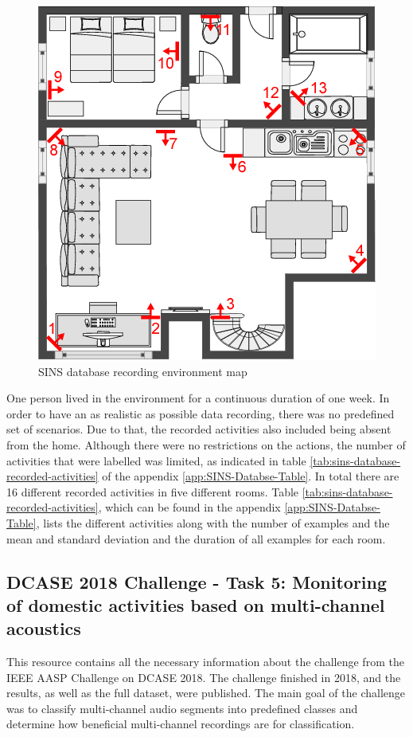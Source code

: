 \begin{figure}[htbp]
	\centering
	\includegraphics[scale=0.5]{baa-documentation/img/SINS_database_floor_map.png}
	\caption[SINS database recording environment map]{SINS database recording environment map \footnotemark}
	\label{fig:sins-database-floor-map}
\end{figure}
\noindent
One person lived in the environment for a continuous duration of one week. In order to have an as realistic as possible data recording, there was no predefined set of scenarios. Due to that, the recorded activities also included being absent from the home. Although there were no restrictions on the actions, the number of activities that were labelled was limited, as indicated in table \ref{tab:sins-database-recorded-activities} of the appendix \ref{app:SINS-Databse-Table}. In total there are 16 different recorded activities in five different rooms. Table \ref{tab:sins-database-recorded-activities}, which can be found in the appendix \ref{app:SINS-Databse-Table}, lists the different activities along with the number of examples and the mean and standard deviation and the duration of all examples for each room.

\subsection[DCASE 2018 Challenge - Task 5]{DCASE 2018 Challenge - Task 5: Monitoring of domestic activities based on multi-channel acoustics }
\label{sub:DCASE-Task-Dataset}
This resource contains all the necessary information about the challenge from the IEEE AASP Challenge on \gls{DCASE} 2018. The challenge finished in 2018, and the results, as well as the full dataset, were published. The main goal of the challenge was to classify multi-channel audio segments into predefined classes and determine how beneficial multi-channel recordings are for classification. 

